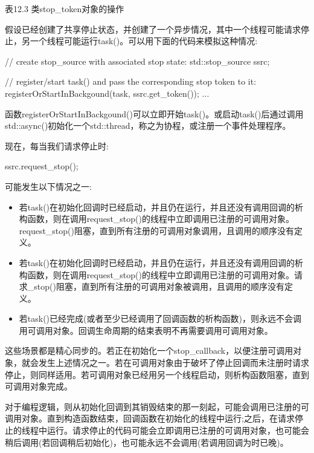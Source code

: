 \begin{center}
表12.3 类stop\_token对象的操作
\end{center}

假设已经创建了共享停止状态，并创建了一个异步情况，其中一个线程可能请求停止，另一个线程可能运行task()。可以用下面的代码来模拟这种情况:

\begin{cpp}
// create stop_source with associated stop state:
std::stop_source ssrc;

// register/start task() and pass the corresponding stop token to it:
registerOrStartInBackgound(task, ssrc.get_token());
...
\end{cpp}

函数registerOrStartInBackgound()可以立即开始task()。或启动task()后通过调用std::async()初始化一个std::thread，称之为协程，或注册一个事件处理程序。

现在，每当我们请求停止时:

\begin{cpp}
ssrc.request_stop();
\end{cpp}

可能发生以下情况之一:

\begin{itemize}
\item 
若task()在初始化回调时已经启动，并且仍在运行，并且还没有调用回调的析构函数，则在调用request\_stop()的线程中立即调用已注册的可调用对象。request\_stop()阻塞，直到所有注册的可调用对象调用，且调用的顺序没有定义。

\item
若task()在初始化回调时已经启动，并且仍在运行，并且还没有调用回调的析构函数，则在调用request\_stop()的线程中立即调用已注册的可调用对象。请求\_stop()阻塞，直到所有注册的可调用对象被调用，且调用的顺序没有定义。

\item
若task()已经完成(或者至少已经调用了回调函数的析构函数)，则永远不会调用可调用对象。回调生命周期的结束表明不再需要调用可调用对象。
\end{itemize}

这些场景都是精心同步的。若正在初始化一个stop\_callback，以便注册可调用对象，就会发生上述情况之一。若在可调用对象由于破坏了停止回调而未注册时请求停止，则同样适用。若可调用对象已经用另一个线程启动，则析构函数阻塞，直到可调用对象完成。

对于编程逻辑，则从初始化回调到其销毁结束的那一刻起，可能会调用已注册的可调用对象。直到构造函数结束，回调函数在初始化的线程中运行;之后，在请求停止的线程中运行。请求停止的代码可能会立即调用已注册的可调用对象，也可能会稍后调用(若回调稍后初始化)，也可能永远不会调用(若调用回调为时已晚)。

